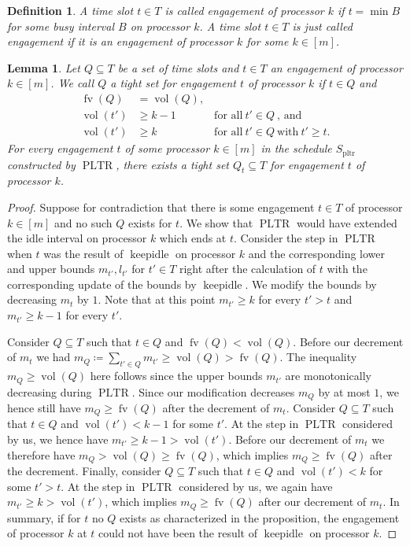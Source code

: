 \documentclass[a4paper]{article}
\DeclareMathOperator{\pltr}{pltr}
\DeclareMathOperator{\PLTR}{PLTR}
\DeclareMathOperator{\fv}{fv}
\DeclareMathOperator{\vol}{vol}
\DeclareMathOperator{\keepidle}{keepidle}
\newtheorem{lemma}[theorem]{Lemma}
\newtheorem{definition}[theorem]{Definition}
\begin{document}
\begin{definition}
  A time slot $t \in T$ is called \emph{engagement of processor $k$} if $t = \min B$ for some busy interval $B$ on processor $k$.
  A time slot $t \in T$ is just called \emph{engagement} if it is an engagement of processor $k$ for some $k \in [m]$.
\end{definition}
\begin{lemma}\label{lemma:critical}
  Let $Q \subseteq T$ be a set of time slots and $t \in T$ an engagement of processor $k \in [m]$.
  We call $Q$ a \emph{tight set for engagement $t$ of processor $k$} if $t \in Q$ and
  \begin{align}
    \fv(Q) &= \vol(Q) \text{,}\\
    \vol(t') &\geq k-1 &~\text{for all}~t' \in Q~\text{, and}\\
    \vol(t') &\geq k &~\text{for all}~t' \in Q~\text{with}~t' \geq t \text{.}
  \end{align}
  For every engagement $t$ of some processor $k \in [m]$ in the schedule $S_{\pltr}$ constructed by $\PLTR$, there exists a tight set $Q_t \subseteq T$ for engagement $t$ of processor $k$.
\end{lemma}
\begin{proof}
  Suppose for contradiction that there is some engagement $t \in T$ of processor $k \in [m]$ and no such $Q$ exists for $t$.
  We show that $\PLTR$ would have extended the idle interval on processor $k$ which ends at $t$.
  Consider the step in $\PLTR$ when $t$ was the result of $\keepidle$ on processor $k$ and the corresponding lower and upper bounds $m_{t'}, l_{t'}$ for $t' \in T$ right after the calculation of $t$ with the corresponding update of the bounds by $\keepidle$.
  We modify the bounds by decreasing $m_t$ by $1$.
  Note that at this point $m_{t'} \geq k$ for every $t' > t$ and $m_{t'} \geq k - 1$ for every $t'$.

  Consider $Q \subseteq T$ such that $t \in Q$ and $\fv(Q) < \vol(Q)$.
  Before our decrement of $m_t$ we had $m_Q \coloneqq \sum_{t' \in Q} m_{t'} \geq \vol(Q) > \fv(Q)$.
  The inequality $m_Q \geq \vol(Q)$ here follows since the upper bounds $m_{t'}$ are monotonically decreasing during $\PLTR$.
  Since our modification decreases $m_Q$ by at most $1$, we hence still have $m_Q \geq \fv(Q)$ after the decrement of $m_t$.
  Consider $Q \subseteq T$ such that $t \in Q$ and $\vol(t') < k - 1$ for some $t'$.
  At the step in $\PLTR$ considered by us, we hence have $m_{t'} \geq k - 1 > \vol(t')$.
  Before our decrement of $m_t$ we therefore have $m_Q > \vol(Q) \geq \fv(Q)$, which implies $m_Q \geq \fv(Q)$ after the decrement.
  Finally, consider $Q \subseteq T$ such that $t \in Q$ and $\vol(t') < k$ for some $t' > t$.
  At the step in $\PLTR$ considered by us, we again have $m_{t'} \geq k > \vol(t')$, which implies $m_Q \geq \fv(Q)$ after our decrement of $m_t$.
  In summary, if for $t$ no $Q$ exists as characterized in the proposition, the engagement of processor $k$ at $t$ could not have been the result of $\keepidle$ on processor $k$.
\end{proof}
\end{document}
